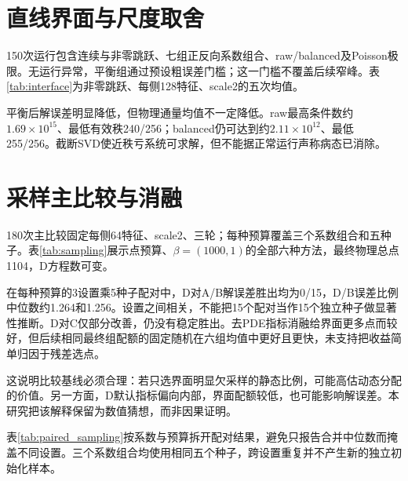 \section{直线界面与尺度取舍}
150次运行包含连续与非零跳跃、七组正反向系数组合、raw/balanced及Poisson极限。无运行异常，平衡组通过预设粗误差门槛；这一门槛不覆盖后续窄峰。表\ref{tab:interface}为非零跳跃、每侧128特征、scale2的五次均值。
\begin{table}[htbp]\centering\caption{高对比度下解与物理通量，五种子均值及样本标准差}\label{tab:interface}\resizebox{\textwidth}{!}{}\end{table}
平衡后解误差明显降低，但物理通量均值不一定降低。raw最高条件数约$1.69\times10^{15}$、最低有效秩240/256；balanced仍可达到约$2.11\times10^{12}$、最低255/256。截断SVD使近秩亏系统可求解，但不能据正常运行声称病态已消除。

\section{采样主比较与消融}
180次主比较固定每侧64特征、scale2、三轮；每种预算覆盖三个系数组合和五种子。表\ref{tab:sampling}展示点预算、$\beta=(1000,1)$的全部六种方法，最终物理总点1104，D方程数可变。
\begin{table}[htbp]\centering\caption{等物理点预算下采样与消融，误差为均值及样本标准差}\label{tab:sampling}\resizebox{\textwidth}{!}{}\end{table}
在每种预算的3设置乘5种子配对中，D对A/B解误差胜出均为0/15，D/B误差比例中位数约1.264和1.256。设置之间相关，不能把15个配对当作15个独立种子做显著性推断。D对C仅部分改善，仍没有稳定胜出。去PDE指标消融给界面更多点而较好，但后续相同最终组配额的固定随机在六组均值中更好且更快，未支持把收益简单归因于残差选点。

这说明比较基线必须合理：若只选界面明显欠采样的静态比例，可能高估动态分配的价值。另一方面，D默认指标偏向内部，界面配额较低，也可能影响解误差。本研究把该解释保留为数值猜想，而非因果证明。

表\ref{tab:paired_sampling}按系数与预算拆开配对结果，避免只报告合并中位数而掩盖不同设置。三个系数组合均使用相同五个种子，跨设置重复并不产生新的独立初始化样本。
\begin{table}[p]\centering\caption{平滑模型的分设置配对；比值为D误差除以基线误差}\label{tab:paired_sampling}\end{table}

